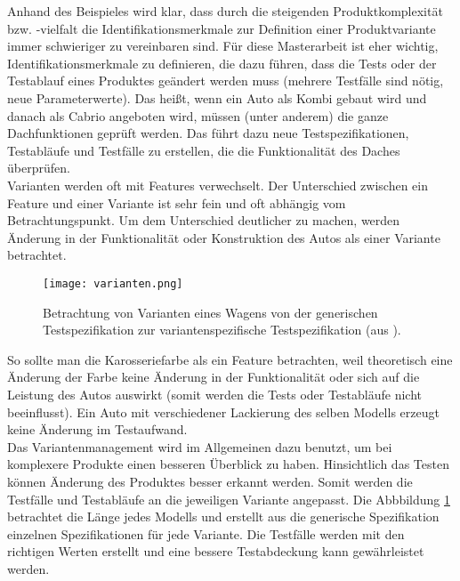 Anhand des Beispieles wird klar, dass durch die steigenden Produktkomplexität bzw. -vielfalt die Identifikationsmerkmale zur Definition einer Produktvariante immer schwieriger zu vereinbaren sind. Für diese Masterarbeit ist eher wichtig, Identifikationsmerkmale zu definieren, die dazu führen, dass die Tests oder der Testablauf eines Produktes geändert werden muss (mehrere Testfälle sind nötig, neue Parameterwerte). Das heißt, wenn ein Auto als Kombi gebaut wird und danach als Cabrio angeboten wird, müssen (unter anderem) die ganze Dachfunktionen geprüft werden. Das führt dazu neue Testspezifikationen, Testabläufe und Testfälle zu erstellen, die die Funktionalität des Daches überprüfen.\\


Varianten werden oft mit Features verwechselt. Der Unterschied zwischen ein Feature und einer Variante ist sehr fein und oft abhängig vom Betrachtungspunkt. Um dem Unterschied deutlicher zu machen, werden Änderung in der Funktionalität oder Konstruktion des Autos als einer Variante betrachtet.

\begin{figure}[h!]
  \begin{center}
    \texttt{[image: varianten.png]}
  		  \caption{Betrachtung von Varianten eines Wagens von der generischen Testspezifikation zur variantenspezifische Testspezifikation (aus \cite{VarMan1}).}
     \label{variantsOverview}
  \end{center}
\end{figure}



So sollte man die Karosseriefarbe als ein Feature betrachten, weil theoretisch eine Änderung der Farbe keine Änderung in der Funktionalität oder sich auf die Leistung des Autos auswirkt (somit werden die Tests oder Testabläufe nicht beeinflusst). Ein Auto mit verschiedener Lackierung des selben Modells erzeugt keine Änderung im Testaufwand\cite{VarMan2}.\\


Das Variantenmanagement wird im Allgemeinen dazu benutzt, um bei komplexere Produkte einen besseren Überblick zu haben. Hinsichtlich das Testen können Änderung des Produktes besser erkannt werden. Somit werden die Testfälle und Testabläufe an die jeweiligen Variante angepasst. Die Abbbildung \ref{variantsOverview} betrachtet die Länge jedes Modells und erstellt aus die generische Spezifikation einzelnen Spezifikationen für jede Variante. Die Testfälle werden mit den richtigen Werten erstellt und eine bessere Testabdeckung kann gewährleistet werden.\\


